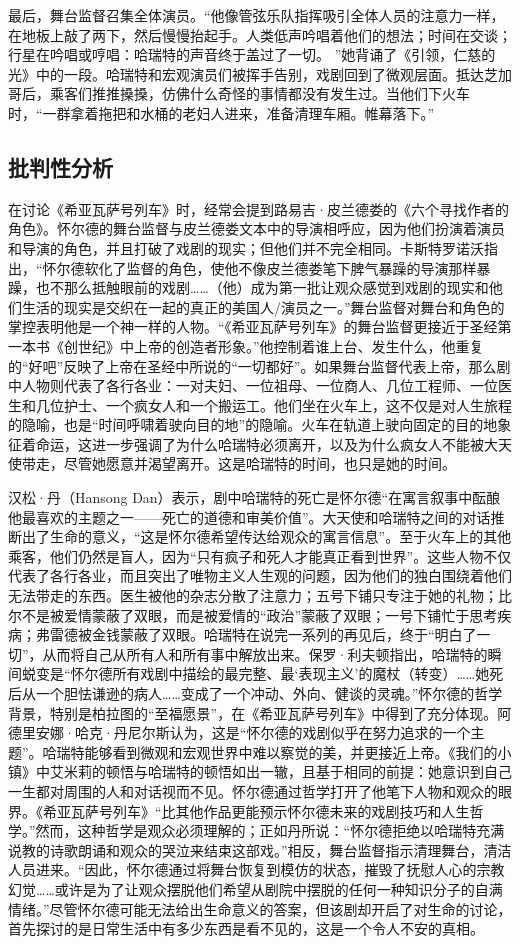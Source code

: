 \documentclass[lang=cn,newtx,12pt,scheme=chinese]{elegantbook}
\begin{document}
最后，舞台监督召集全体演员。“他像管弦乐队指挥吸引全体人员的注意力一样，在地板上敲了两下，然后慢慢抬起手。人类低声吟唱着他们的想法；时间在交谈；行星在吟唱或哼唱：哈瑞特的声音终于盖过了一切。 ”她背诵了《引领，仁慈的光》中的一段。哈瑞特和宏观演员们被挥手告别，戏剧回到了微观层面。抵达芝加哥后，乘客们推推搡搡，仿佛什么奇怪的事情都没有发生过。当他们下火车时，“一群拿着拖把和水桶的老妇人进来，准备清理车厢。帷幕落下。”

\subsection{批判性分析}

在讨论《希亚瓦萨号列车》时，经常会提到路易吉·皮兰德娄的《六个寻找作者的角色》。怀尔德的舞台监督与皮兰德娄文本中的导演相呼应，因为他们扮演着演员和导演的角色，并且打破了戏剧的现实；但他们并不完全相同。卡斯特罗诺沃指出，“怀尔德软化了监督的角色，使他不像皮兰德娄笔下脾气暴躁的导演那样暴躁，也不那么抵触眼前的戏剧……（他）成为第一批让观众感觉到戏剧的现实和他们生活的现实是交织在一起的真正的美国人/演员之一。”舞台监督对舞台和角色的掌控表明他是一个神一样的人物。“《希亚瓦萨号列车》的舞台监督更接近于圣经第一本书《创世纪》中上帝的创造者形象。”他控制着谁上台、发生什么，他重复的“好吧”反映了上帝在圣经中所说的“一切都好”。如果舞台监督代表上帝，那么剧中人物则代表了各行各业：一对夫妇、一位祖母、一位商人、几位工程师、一位医生和几位护士、一个疯女人和一个搬运工。他们坐在火车上，这不仅是对人生旅程的隐喻，也是“时间呼啸着驶向目的地”的隐喻。火车在轨道上驶向固定的目的地象征着命运，这进一步强调了为什么哈瑞特必须离开，以及为什么疯女人不能被大天使带走，尽管她愿意并渴望离开。这是哈瑞特的时间，也只是她的时间。

汉松·丹（Hansong Dan）表示，剧中哈瑞特的死亡是怀尔德“在寓言叙事中酝酿他最喜欢的主题之一——死亡的道德和审美价值”。大天使和哈瑞特之间的对话推断出了生命的意义，“这是怀尔德希望传达给观众的寓言信息”。至于火车上的其他乘客，他们仍然是盲人，因为“只有疯子和死人才能真正看到世界”。这些人物不仅代表了各行各业，而且突出了唯物主义人生观的问题，因为他们的独白围绕着他们无法带走的东西。医生被他的杂志分散了注意力；五号下铺只专注于她的礼物；比尔不是被爱情蒙蔽了双眼，而是被爱情的“政治”蒙蔽了双眼；一号下铺忙于思考疾病；弗雷德被金钱蒙蔽了双眼。哈瑞特在说完一系列的再见后，终于“明白了一切”，从而将自己从所有人和所有事中解放出来。保罗·利夫顿指出，哈瑞特的瞬间蜕变是“怀尔德所有戏剧中描绘的最完整、最‘表现主义’的魔杖（转变）……她死后从一个胆怯谦逊的病人……变成了一个冲动、外向、健谈的灵魂。”怀尔德的哲学背景，特别是柏拉图的“至福愿景”，在《希亚瓦萨号列车》中得到了充分体现。阿德里安娜·哈克·丹尼尔斯认为，这是“怀尔德的戏剧似乎在努力追求的一个主题”。哈瑞特能够看到微观和宏观世界中难以察觉的美，并更接近上帝。《我们的小镇》中艾米莉的顿悟与哈瑞特的顿悟如出一辙，且基于相同的前提：她意识到自己一生都对周围的人和对话视而不见。怀尔德通过哲学打开了他笔下人物和观众的眼界。《希亚瓦萨号列车》“比其他作品更能预示怀尔德未来的戏剧技巧和人生哲学。”然而，这种哲学是观众必须理解的；正如丹所说：“怀尔德拒绝以哈瑞特充满说教的诗歌朗诵和观众的哭泣来结束这部戏。”相反，舞台监督指示清理舞台，清洁人员进来。“因此，怀尔德通过将舞台恢复到模仿的状态，摧毁了抚慰人心的宗教幻觉……或许是为了让观众摆脱他们希望从剧院中摆脱的任何一种知识分子的自满情绪。”尽管怀尔德可能无法给出生命意义的答案，但该剧却开启了对生命的讨论，首先探讨的是日常生活中有多少东西是看不见的，这是一个令人不安的真相。
\end{document}

